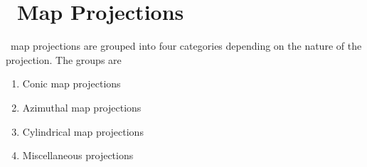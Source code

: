 %
%
\chapter{\gmt\ Map Projections}
\thispagestyle{headings}

\GMT\ map projections are grouped into four categories depending on the
nature of the projection.  The groups are
\begin{enumerate}
\item Conic map projections
\item Azimuthal map projections
\item Cylindrical map projections
\item Miscellaneous projections
\end{enumerate}





